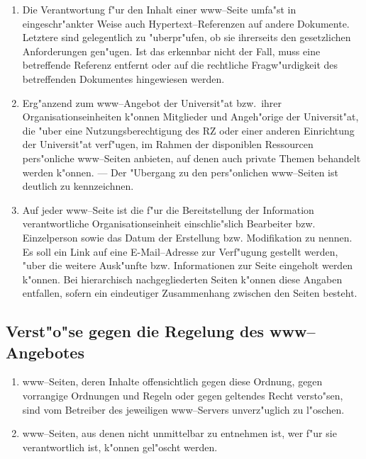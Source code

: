\documentclass[12pt,titlepage,twoside]{scrartcl}
\begin{document}
\begin{appendix}
\begin{enumerate}
  \item Die Verantwortung f"ur den Inhalt einer www--Seite
        umfa"st in eingeschr"ankter Weise auch
        Hypertext--Referenzen auf andere Dokumente. Letztere sind
        gelegentlich zu "uberpr"ufen, ob sie ihrerseits
        den gesetzlichen Anforderungen gen"ugen. Ist das erkennbar
        nicht der Fall, muss eine betreffende Referenz entfernt
        oder auf die rechtliche Fragw"urdigkeit des betreffenden
        Dokumentes hingewiesen werden.

  \item Erg"anzend zum www--Angebot der Universit"at bzw.\  ihrer
        Organisationseinheiten k"onnen Mitglieder und Angeh"orige
        der Universit"at, die "uber eine Nutzungsberechtigung
        des RZ oder einer anderen Einrichtung der Universit"at
        verf"ugen, im Rahmen der disponiblen Ressourcen
        pers"onliche www--Seiten
        anbieten, auf denen auch private Themen behandelt werden
        k"onnen. --- Der "Ubergang zu den pers"onlichen
        www--Seiten ist deutlich zu kennzeichnen.

  \item Auf jeder www--Seite ist die f"ur die Bereitstellung der
        Information verantwortliche Organisationseinheit
        einschlie"slich Bearbeiter bzw. Einzelperson sowie das
        Datum der Erstellung bzw. Modifikation zu nennen. Es soll ein
        Link auf eine E-Mail--Adresse zur Verf"ugung gestellt werden,
        "uber die weitere Ausk"unfte bzw. Informationen zur
        Seite eingeholt werden k"onnen. Bei hierarchisch
        nachgegliederten Seiten k"onnen diese Angaben entfallen,
        sofern ein eindeutiger Zusammenhang zwischen den Seiten besteht.
\end{enumerate}

\subsection{Verst"o"se gegen die Regelung des www--Angebotes}

\begin{enumerate}
  \item www--Seiten, deren Inhalte offensichtlich gegen diese Ordnung,
        gegen vorrangige Ordnungen und Regeln oder gegen geltendes
        Recht versto"sen, sind vom Betreiber des jeweiligen
        www--Servers unverz"uglich zu l"oschen.

  \item www--Seiten, aus denen nicht unmittelbar zu entnehmen ist,
        wer f"ur sie verantwortlich ist, k"onnen gel"oscht
        werden.


\end{enumerate}
\end{appendix}
\end{document}
